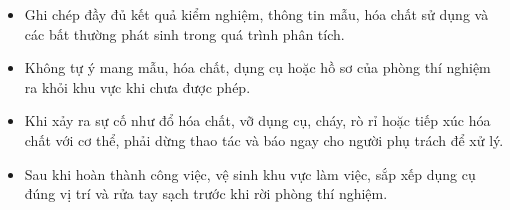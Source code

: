 \begin{itemize}
  \item Ghi chép đầy đủ kết quả kiểm nghiệm, thông tin mẫu, hóa chất sử dụng và các bất thường phát sinh trong quá trình phân tích.
  \item Không tự ý mang mẫu, hóa chất, dụng cụ hoặc hồ sơ của phòng thí nghiệm ra khỏi khu vực khi chưa được phép.
  \item Khi xảy ra sự cố như đổ hóa chất, vỡ dụng cụ, cháy, rò rỉ hoặc tiếp xúc hóa chất với cơ thể, phải dừng thao tác và báo ngay cho người phụ trách để xử lý.
  \item Sau khi hoàn thành công việc, vệ sinh khu vực làm việc, sắp xếp dụng cụ đúng vị trí và rửa tay sạch trước khi rời phòng thí nghiệm.
\end{itemize}
